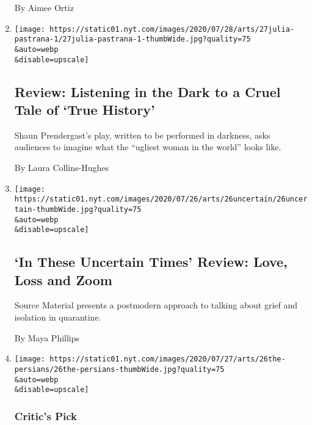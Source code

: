 \begin{enumerate}
  By Aimee Ortiz
\item
  \href{/2020/07/27/theater/true-history-julia-pastrana-review.html}{}

  \texttt{[image: https://static01.nyt.com/images/2020/07/28/arts/27julia-pastrana-1/27julia-pastrana-1-thumbWide.jpg?quality=75\\\&auto=webp\\\&disable=upscale]}

  \hypertarget{review-listening-in-the-dark-to-a-cruel-tale-of-true-history}{%
  \subsection{Review: Listening in the Dark to a Cruel Tale of `True
  History'}\label{review-listening-in-the-dark-to-a-cruel-tale-of-true-history}}

  Shaun Prendergast's play, written to be performed in darkness, asks
  audiences to imagine what the ``ugliest woman in the world'' looks
  like.

  By Laura Collins-Hughes
\item
  \href{/2020/07/26/theater/in-these-uncertain-times-review.html}{}

  \texttt{[image: https://static01.nyt.com/images/2020/07/26/arts/26uncertain/26uncertain-thumbWide.jpg?quality=75\\\&auto=webp\\\&disable=upscale]}

  \hypertarget{in-these-uncertain-times-review-love-loss-and-zoom}{%
  \subsection{`In These Uncertain Times' Review: Love, Loss and
  Zoom}\label{in-these-uncertain-times-review-love-loss-and-zoom}}

  Source Material presents a postmodern approach to talking about grief
  and isolation in quarantine.

  By Maya Phillips
\item
  \href{/2020/07/26/theater/the-persians-review-aeschylus.html}{}

  \texttt{[image: https://static01.nyt.com/images/2020/07/27/arts/26the-persians/26the-persians-thumbWide.jpg?quality=75\\\&auto=webp\\\&disable=upscale]}

  \hypertarget{critics-pick-1}{%
  \subsubsection{Critic's Pick}\label{critics-pick-1}}

  \hypertarget{the-persians-review-aeschyluss-ancient-portrait-of-defeat}{%
}
\end{enumerate}

